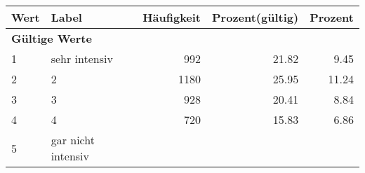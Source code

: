      \begin{longtable}{lXrrr}
     \toprule
     \textbf{Wert} & \textbf{Label} & \textbf{Häufigkeit} & \textbf{Prozent(gültig)} & \textbf{Prozent} \\
     \endhead
     \midrule
     \multicolumn{5}{l}{\textbf{Gültige Werte}}\\

     1 &
     \multicolumn{1}{X}{ sehr intensiv   } &


       \num{992} &
       \num[round-mode=places,round-precision=2]{21,82} &
         \num[round-mode=places,round-precision=2]{9,45} \\

     2 &
     \multicolumn{1}{X}{ 2   } &


       \num{1180} &
       \num[round-mode=places,round-precision=2]{25,95} &
         \num[round-mode=places,round-precision=2]{11,24} \\

     3 &
     \multicolumn{1}{X}{ 3   } &


       \num{928} &
       \num[round-mode=places,round-precision=2]{20,41} &
         \num[round-mode=places,round-precision=2]{8,84} \\

     4 &
     \multicolumn{1}{X}{ 4   } &


       \num{720} &
       \num[round-mode=places,round-precision=2]{15,83} &
         \num[round-mode=places,round-precision=2]{6,86} \\

     5 &
     \multicolumn{1}{X}{ gar nicht intensiv   } &



\end{longtable}
